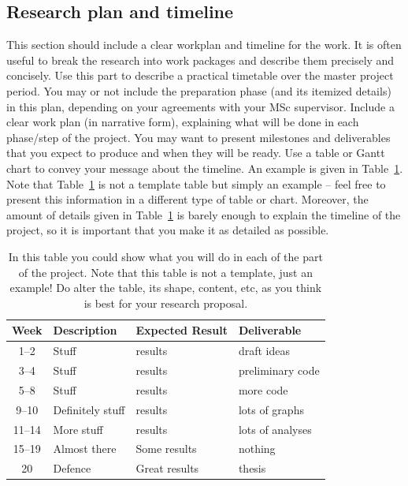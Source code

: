 \documentclass{article}
\begin{document}
\subsection{Research plan and timeline}
This section should include a clear workplan and timeline for the work. It is often useful to break the research into work packages and describe them precisely and concisely. Use this part to describe a practical timetable over the master project period. You may or not include the preparation phase (and its itemized details) in this plan, depending on your agreements with your MSc supervisor. Include a clear work plan (in narrative form), explaining what will be done in each phase/step of the project. You may want to present milestones and deliverables that you expect to produce and when they will be ready. Use a table or Gantt chart to convey your message about the timeline. An example is given in Table~\ref{tab1}. Note that Table~\ref{tab1} is not a template table but simply an example -- feel free to present this information in a different type of table or chart. Moreover, the amount of details given in Table~\ref{tab1} is barely enough to explain the timeline of the project, so it is important that you make it as detailed as possible.

\begin{table}[htp]
  \caption{In this table you could show what you will do in each of the part of the project. Note that this table is not a template, just an example! Do alter the table, its shape, content, etc, as you think is best for your research proposal.}\label{tab1}
  \begin{center}
    \begin{tabular}{c|l|l|l}
      Week   & Description      & Expected Result & Deliverable      \\
      \hline
      1--2   & Stuff            & results         & draft ideas      \\
      3--4   & Stuff            & results         & preliminary code \\
      5--8   & Stuff            & results         & more code        \\
      9--10  & Definitely stuff & results         & lots of graphs   \\
      11--14 & More stuff       & results         & lots of analyses \\
      15--19 & Almost there     & Some results    & nothing          \\
      20     & Defence          & Great results   & thesis           \\
      \hline
    \end{tabular}
  \end{center}
\end{table}
\end{document}
